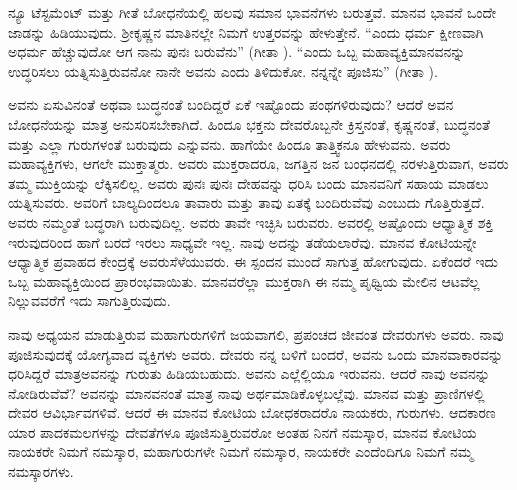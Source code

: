 ನ್ಯೂ ಟೆಸ್ಟಮೆಂಟ್​ ಮತ್ತು ಗೀತೆ ಬೋಧನೆಯಲ್ಲಿ ಹಲವು ಸಮಾನ ಭಾವನೆಗಳು ಬರುತ್ತವೆ. ಮಾನವ ಭಾವನೆ ಒಂದೇ ಜಾಡನ್ನು ಹಿಡಿಯುವುದು. ಶ‍್ರೀಕೃಷ್ಣನ ಮಾತಿನಲ್ಲೇ ನಿಮಗೆ ಉತ್ತರವನ್ನು ಹೇಳುತ್ತೇನೆ. “ಎಂದು ಧರ್ಮ ಕ್ಷೀಣವಾಗಿ ಅಧರ್ಮ ಹೆಚ್ಚುವುದೋ ಆಗ ನಾನು ಪುನಃ ಬರುವೆನು” (ಗೀತಾ ). “ಎಂದು ಒಬ್ಬ ಮಹಾವ್ಯಕ್ತಿ\break ಮಾನವನನ್ನು ಉದ್ಧರಿಸಲು ಯತ್ನಿಸುತ್ತಿರುವನೋ ನಾನೇ ಅವನು ಎಂದು ತಿಳಿದುಕೋ. ನನ್ನನ್ನೇ ಪೂಜಿಸು” (ಗೀತಾ ).

ಅವನು ಏಸುವಿನಂತೆ ಅಥವಾ ಬುದ್ಧನಂತೆ ಬಂದಿದ್ದರೆ ಏಕೆ ಇಷ್ಟೊಂದು ಪಂಥ\-ಗಳಿರುವುದು? ಆದರೆ ಅವನ ಬೋಧನೆಯನ್ನು ಮಾತ್ರ ಅನುಸರಿಸಬೇಕಾಗಿದೆ. ಹಿಂದೂ ಭಕ್ತನು ದೇವರೊಬ್ಬನೇ ಕ್ರಿಸ್ತನಂತೆ, ಕೃಷ್ಣನಂತೆ, ಬುದ್ಧನಂತೆ ಮತ್ತು ಎಲ್ಲಾ ಗುರುಗಳಂತೆ ಬರುವುದು ಎನ್ನುವನು. ಹಾಗೆಯೇ ಹಿಂದೂ ತಾತ್ತ್ವಿಕನೂ ಹೇಳುವನು. ಅವರು ಮಹಾವ್ಯಕ್ತಿಗಳು, ಆಗಲೇ ಮುಕ್ತಾತ್ಮರು. ಅವರು ಮುಕ್ತರಾದರೂ, ಜಗತ್ತಿನ ಜನ ಬಂಧನದಲ್ಲಿ ನರಳು\-ತ್ತಿರುವಾಗ, ಅವರು ತಮ್ಮ ಮುಕ್ತಿಯನ್ನು ಲೆಕ್ಕಿಸಲಿಲ್ಲ. ಅವರು ಪುನಃ ಪುನಃ ದೇಹವನ್ನು ಧರಿಸಿ ಬಂದು ಮಾನವನಿಗೆ ಸಹಾಯ ಮಾಡಲು ಯತ್ನಿಸುವರು. ಅವರಿಗೆ ಬಾಲ್ಯದಿಂದಲೂ ತಾವಾರು ಮತ್ತು ತಾವು ಏತಕ್ಕೆ ಬಂದಿರುವೆವು ಎಂಬುದು ಗೊತ್ತಿರುತ್ತದೆ. ಅವರು ನಮ್ಮಂತೆ ಬದ್ಧರಾಗಿ ಬರುವುದಿಲ್ಲ. ಅವರು ತಾವೇ ಇಚ್ಛಿಸಿ ಬರುವರು. ಅವರಲ್ಲಿ ಅಷ್ಟೊಂದು ಆಧ್ಯಾತ್ಮಿಕ ಶಕ್ತಿ ಇರುವುದರಿಂದ ಹಾಗೆ ಬರದೆ ಇರಲು ಸಾಧ್ಯವೇ ಇಲ್ಲ. ನಾವು ಅದನ್ನು ತಡೆಯಲಾರೆವು. ಮಾನವ ಕೋಟಿಯನ್ನೇ ಆಧ್ಯಾತ್ಮಿಕ ಪ್ರವಾಹದ ಕೇಂದ್ರಕ್ಕೆ ಅವರು\break ಸೆಳೆಯುವರು. ಈ ಸ್ಪಂದನ ಮುಂದೆ ಸಾಗುತ್ತ ಹೋಗುವುದು. ಏಕೆಂದರೆ ಇದು ಒಬ್ಬ ಮಹಾವ್ಯಕ್ತಿಯಿಂದ ಪ್ರಾರಂಭವಾಯಿತು. ಮಾನವರೆಲ್ಲಾ ಮುಕ್ತರಾಗಿ ಈ ನಮ್ಮ ಪೃಥ್ವಿಯ ಮೇಲಿನ ಆಟವೆಲ್ಲ ನಿಲ್ಲುವವರೆಗೆ ಇದು ಸಾಗುತ್ತಿರುವುದು.

ನಾವು ಅಧ್ಯಯನ ಮಾಡುತ್ತಿರುವ ಮಹಾಗುರುಗಳಿಗೆ ಜಯವಾಗಲಿ, ಪ್ರಪಂಚದ ಜೀವಂತ ದೇವರುಗಳು ಅವರು. ನಾವು ಪೂಜಿಸುವುದಕ್ಕೆ ಯೋಗ್ಯವಾದ ವ್ಯಕ್ತಿಗಳು ಅವರು. ದೇವರು ನನ್ನ ಬಳಿಗೆ ಬಂದರೆ, ಅವನು ಒಂದು ಮಾನವಾಕಾರವನ್ನು ಧರಿಸಿದ್ದರೆ ಮಾತ್ರ\break ಅವನನ್ನು ಗುರುತು ಹಿಡಿಯಬಹುದು. ಅವನು ಎಲ್ಲೆಲ್ಲಿಯೂ ಇರುವನು. ಆದರೆ ನಾವು ಅವನನ್ನು ನೋಡಿರುವೆವೆ? ಅವನನ್ನು ಮಾನವನಂತೆ ಮಾತ್ರ ನಾವು ಅರ್ಥಮಾಡಿಕೊಳ್ಳಬಲ್ಲೆವು. ಮಾನವ ಮತ್ತು ಪ್ರಾಣಿಗಳಲ್ಲಿ ದೇವರ ಆವಿರ್ಭಾವಗಳಿವೆ. ಆದರೆ ಈ ಮಾನವ ಕೋಟಿಯ ಬೋಧಕರಾದರೊ ನಾಯಕರು, ಗುರುಗಳು. ಆದಕಾರಣ ಯಾರ ಪಾದಕಮಲಗಳನ್ನು ದೇವತೆಗಳೂ ಪೂಜಿಸುತ್ತಿರುವರೋ ಅಂತಹ ನಿನಗೆ ನಮಸ್ಕಾರ, ಮಾನವ ಕೋಟಿಯ ನಾಯಕರೇ ನಿಮಗೆ ನಮಸ್ಕಾರ, ಮಹಾಗುರುಗಳೇ ನಿಮಗೆ ನಮಸ್ಕಾರ, ನಾಯಕರೇ ಎಂದೆಂದಿಗೂ ನಿಮಗೆ ನಮ್ಮ ನಮಸ್ಕಾರಗಳು.

